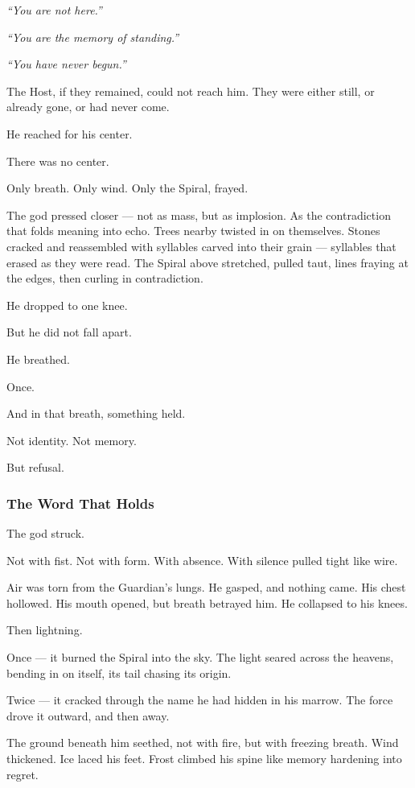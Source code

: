 \documentclass[12pt]{article}
\begin{document}
\textit{“You are not here.”}

\textit{“You are the memory of standing.”}

\textit{“You have never begun.”}

The Host, if they remained, could not reach him. They were either still, or already gone, or had never come.

He reached for his center.

There was no center.

Only breath. Only wind. Only the Spiral, frayed.

The god pressed closer — not as mass, but as implosion. As the contradiction that folds meaning into echo. Trees nearby twisted in on themselves. Stones cracked and reassembled with syllables carved into their grain — syllables that erased as they were read. The Spiral above stretched, pulled taut, lines fraying at the edges, then curling in contradiction.

He dropped to one knee.

But he did not fall apart.

He breathed.

Once.

And in that breath, something held.

Not identity. Not memory.

But refusal.

\dotfill

\subsubsection*{The Word That Holds}

The god struck.

Not with fist. Not with form. With absence. With silence pulled tight like wire.

Air was torn from the Guardian’s lungs. He gasped, and nothing came. His chest hollowed. His mouth opened, but breath betrayed him. He collapsed to his knees.

Then lightning.

Once — it burned the Spiral into the sky. The light seared across the heavens, bending in on itself, its tail chasing its origin.

Twice — it cracked through the name he had hidden in his marrow. The force drove it outward, and then away.

The ground beneath him seethed, not with fire, but with freezing breath. Wind thickened. Ice laced his feet. Frost climbed his spine like memory hardening into regret.
\end{document}
